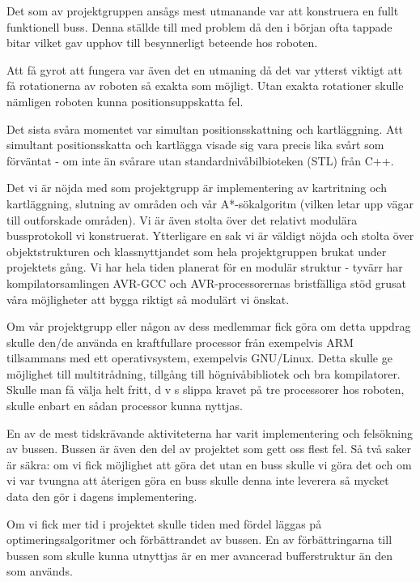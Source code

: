 \documentclass[a4paper,12pt,fleqn]{article}
\begin{document}
Det som av projektgruppen ansågs mest utmanande var att konstruera en fullt funktionell buss. Denna ställde till med problem då den i början ofta tappade bitar vilket gav upphov till besynnerligt beteende hos roboten. 

Att få gyrot att fungera var även det en utmaning då det var ytterst viktigt att få rotationerna av roboten så exakta som möjligt. Utan exakta rotationer skulle nämligen roboten kunna positionsuppskatta fel.

Det sista svåra momentet var simultan positionsskattning och kartläggning. Att simultant positionsskatta och kartlägga visade sig vara precis lika svårt som förväntat - om inte än svårare utan standardnivåbilbioteken (STL) från C++. 


Det vi är nöjda med som projektgrupp är implementering av kartritning och kartläggning, slutning av områden och vår A*-sökalgoritm (vilken letar upp vägar till outforskade områden). Vi är även stolta över det relativt modulära bussprotokoll vi konstruerat. Ytterligare en sak vi är väldigt nöjda och stolta över objektstrukturen och klassnyttjandet som hela projektgruppen brukat under projektets gång.
Vi har hela tiden planerat för en modulär struktur - tyvärr har kompilatorsamlingen AVR-GCC och AVR-processorernas bristfälliga stöd grusat våra möjligheter att bygga riktigt så modulärt vi önskat. 


Om vår projektgrupp eller någon av dess medlemmar fick göra om detta uppdrag skulle den/de använda en kraftfullare processor från exempelvis ARM tillsammans med ett operativsystem, exempelvis GNU/Linux. Detta skulle ge möjlighet till multitrådning, tillgång till högnivåbibliotek och bra kompilatorer. Skulle man få välja helt fritt, d v s slippa kravet på tre processorer hos roboten, skulle enbart en sådan processor kunna nyttjas. 

En av de mest tidskrävande aktiviteterna har varit implementering och felsökning av bussen. Bussen är även den del av projektet som gett oss flest fel. Så två saker är säkra: om vi fick möjlighet att göra det utan en buss skulle vi göra det och om vi var tvungna att återigen göra en buss skulle denna inte leverera så mycket data den gör i dagens implementering. 

Om vi fick mer tid i projektet skulle tiden med fördel läggas på optimeringsalgoritmer och förbättrandet av bussen. En av förbättringarna till bussen som skulle kunna utnyttjas är en mer avancerad bufferstruktur än den som används.
\end{document}
